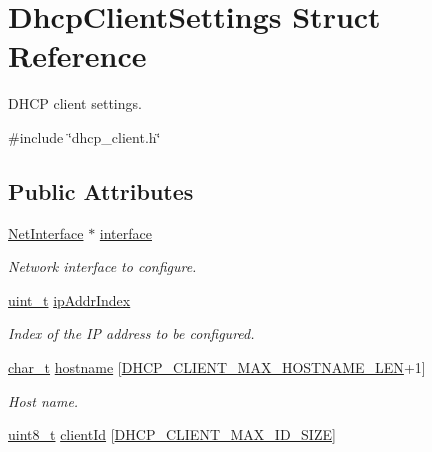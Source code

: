 \hypertarget{structDhcpClientSettings}{}\section{Dhcp\+Client\+Settings Struct Reference}
\label{structDhcpClientSettings}


D\+H\+CP client settings.  




{\ttfamily \#include \char`\"{}dhcp\+\_\+client.\+h\char`\"{}}

\subsection*{Public Attributes}
\begin{DoxyCompactItemize}
\item 
\hyperlink{net_8h_a2234db8911a1148c9159979d8f5e0d6b}{Net\+Interface} $\ast$ \hyperlink{structDhcpClientSettings_a7b79716b929228b11ee6baac5f80ebab}{interface}
\begin{DoxyCompactList}\small\item\em Network interface to configure. \end{DoxyCompactList}\item 
\hyperlink{compiler__port_8h_a12a1e9b3ce141648783a82445d02b58d}{uint\+\_\+t} \hyperlink{structDhcpClientSettings_a8ff0d3572114fbb8aa51fdfeb5e949c5}{ip\+Addr\+Index}
\begin{DoxyCompactList}\small\item\em Index of the IP address to be configured. \end{DoxyCompactList}\item 
\hyperlink{compiler__port_8h_a40bb5262bf908c328fbcfbe5d29d0201}{char\+\_\+t} \hyperlink{structDhcpClientSettings_a06492a9a9fcc12e03b8c1acd2ba0d4c1}{hostname} \mbox{[}\hyperlink{dhcp__client_8h_a5ab1a0b3b4dcec70980a6fa93edd4d2d}{D\+H\+C\+P\+\_\+\+C\+L\+I\+E\+N\+T\+\_\+\+M\+A\+X\+\_\+\+H\+O\+S\+T\+N\+A\+M\+E\+\_\+\+L\+EN}+1\mbox{]}
\begin{DoxyCompactList}\small\item\em Host name. \end{DoxyCompactList}\item 
\hyperlink{stdint_8h_aba7bc1797add20fe3efdf37ced1182c5}{uint8\+\_\+t} \hyperlink{structDhcpClientSettings_af4ca035c3efcf3bf36bf341517990bf5}{client\+Id} \mbox{[}\hyperlink{dhcp__client_8h_a59a4c964d4502c787d95da4f44e7ba92}{D\+H\+C\+P\+\_\+\+C\+L\+I\+E\+N\+T\+\_\+\+M\+A\+X\+\_\+\+I\+D\+\_\+\+S\+I\+ZE}\mbox{]}

\end{DoxyCompactItemize}
